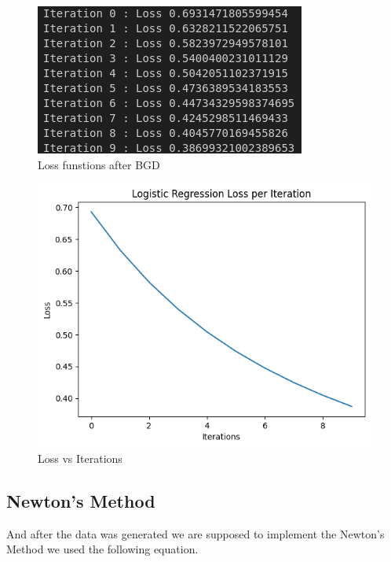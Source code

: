 \documentclass[11pt,a4paper]{article}
\begin{document}
{\begin{figure}[h]
    \centering
    \includegraphics[width=1.0\linewidth]{images/1.png}
    \caption{Loss funstions after BGD}
\end{figure}}

\lstset{style=mystyle}


{\begin{figure}[h]
    \centering
    \includegraphics[width=0.95\linewidth]{images/12.png}
    \caption{Loss vs Iterations}
\end{figure}}

\newpage

\subsection{Newton's Method}

And after the data was generated we are supposed to implement the Newton's Method we used the following equation.
\end{document}
